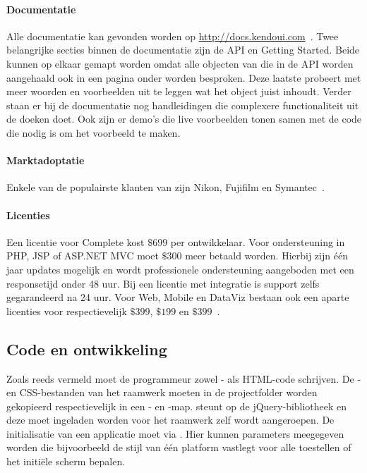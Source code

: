 \paragraph{Documentatie}
Alle documentatie kan gevonden worden op \url{http://docs.kendoui.com}~\cite{Telerikd}.
Twee belangrijke secties binnen de documentatie zijn de API en Getting Started.
Beide kunnen op elkaar gemapt worden omdat alle objecten van \kendo{} die in de API worden aangehaald ook in een pagina onder  worden besproken.
Deze laatste probeert met meer woorden en voorbeelden uit te leggen wat het object juist inhoudt.
Verder staan er bij de documentatie nog handleidingen die complexere functionaliteit uit de doeken doet.
Ook zijn er demo's die live voorbeelden tonen samen met de code die nodig is om het voorbeeld te maken.

\paragraph{Marktadoptatie}
Enkele van de populairste klanten van \kendo{} zijn Nikon,  Fujifilm en Symantec~\cite{Telerike}.

\paragraph{Licenties}
Een licentie voor \kendo{} Complete kost $\$699$ per ontwikkelaar.
Voor  ondersteuning in PHP,  JSP of ASP.NET MVC moet $\$300$ meer betaald worden.
Hierbij zijn één jaar updates mogelijk en wordt professionele ondersteuning aangeboden met een responsetijd onder 48 uur.
Bij een licentie met  integratie is support zelfs gegarandeerd na 24 uur.
Voor \kendo{} Web,  Mobile en DataViz bestaan ook een aparte licenties voor respectievelijk $\$399$,  $\$199$ en $\$399$~\cite{Telerik}.

\subsection{Code en ontwikkeling}
Zoals reeds vermeld moet de programmeur zowel \js{}- als HTML-code schrijven. 
De \js{}- en CSS-bestanden van het raamwerk moeten in de projectfolder worden gekopieerd respectievelijk in een - en -map.
\kendo{} steunt op de jQuery-bibliotheek en deze moet ingeladen worden voor het \kendo{} raamwerk zelf wordt aangeroepen.
De initialisatie van een applicatie moet via .
Hier kunnen parameters meegegeven worden die bijvoorbeeld de stijl van één platform vastlegt voor alle toestellen of het initiële scherm bepalen.

